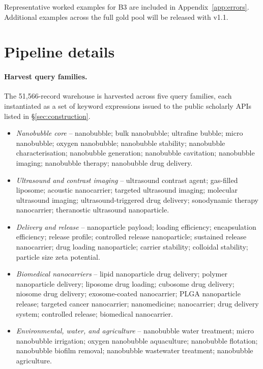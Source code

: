 \documentclass{article}
\begin{document}
Representative worked examples for B3 are included in
Appendix~\ref{app:errors}. Additional examples across the full gold
pool will be released with v1.1.

\section{Pipeline details}
\label{app:pipeline}

\paragraph{Harvest query families.}
The 51{,}566-record warehouse is harvested across five query
families, each instantiated as a set of keyword expressions issued to
the public scholarly APIs listed in \S\ref{sec:construction}.

\begin{itemize}\itemsep0pt
\item \emph{Nanobubble core} -- nanobubble; bulk nanobubble; ultrafine
bubble; micro nanobubble; oxygen nanobubble; nanobubble stability;
nanobubble characterisation; nanobubble generation; nanobubble
cavitation; nanobubble imaging; nanobubble therapy; nanobubble drug
delivery.
\item \emph{Ultrasound and contrast imaging} -- ultrasound contrast
agent; gas-filled liposome; acoustic nanocarrier; targeted ultrasound
imaging; molecular ultrasound imaging; ultrasound-triggered drug
delivery; sonodynamic therapy nanocarrier; theranostic ultrasound
nanoparticle.
\item \emph{Delivery and release} -- nanoparticle payload; loading
efficiency; encapsulation efficiency; release profile; controlled
release nanoparticle; sustained release nanocarrier; drug loading
nanoparticle; carrier stability; colloidal stability; particle size
zeta potential.
\item \emph{Biomedical nanocarriers} -- lipid nanoparticle drug
delivery; polymer nanoparticle delivery; liposome drug loading;
cubosome drug delivery; niosome drug delivery; exosome-coated
nanocarrier; PLGA nanoparticle release; targeted cancer nanocarrier;
nanomedicine; nanocarrier; drug delivery system; controlled release;
biomedical nanocarrier.
\item \emph{Environmental, water, and agriculture} -- nanobubble
water treatment; micro nanobubble irrigation; oxygen nanobubble
aquaculture; nanobubble flotation; nanobubble biofilm removal;
nanobubble wastewater treatment; nanobubble agriculture.
\end{itemize}
\end{document}

